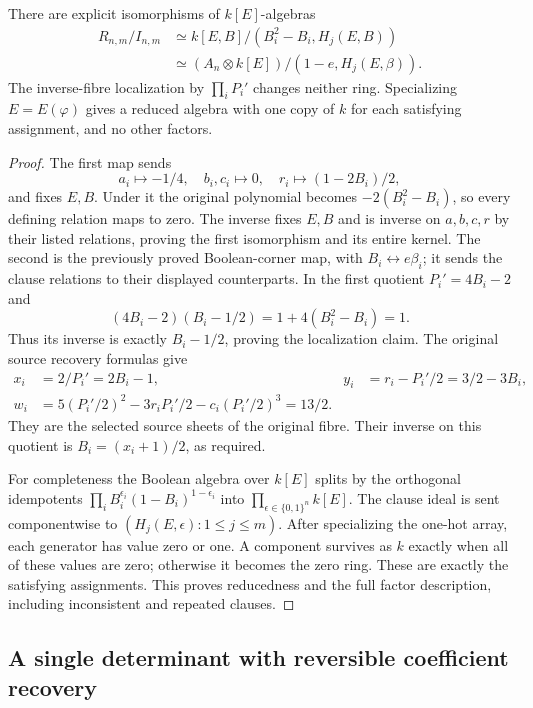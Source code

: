 \begin{proposition}\label{prop:sv-incidence}
There are explicit isomorphisms of $k[E]$-algebras
\begin{align*}
 R_{n,m}/I_{n,m}
 &\simeq k[E,B]/(B_i^2-B_i,H_j(E,B))\\
 &\simeq (A_n\otimes k[E])/(1-e,H_j(E,\beta)).
\end{align*}
The inverse-fibre localization by $\prod_i P_i'$ changes neither
ring. Specializing $E=E(\varphi)$ gives a reduced algebra with one
copy of $k$ for each satisfying assignment, and no other factors.
\end{proposition}
\begin{proof}
The first map sends
\[
 a_i\mapsto-1/4,\quad b_i,c_i\mapsto0,\quad
 r_i\mapsto(1-2B_i)/2,
\]
and fixes $E,B$. Under it the original polynomial becomes
$-2(B_i^2-B_i)$, so every defining relation maps to zero.
The inverse fixes $E,B$ and is inverse on $a,b,c,r$ by their
listed relations, proving the first isomorphism and its entire kernel.
The second is the previously proved Boolean-corner map, with
$B_i\leftrightarrow e\beta_i$; it sends the clause relations to
their displayed counterparts.
In the first quotient $P_i'=4B_i-2$ and
\[
 (4B_i-2)(B_i-1/2)=1+4(B_i^2-B_i)=1.
\]
Thus its inverse is exactly $B_i-1/2$, proving the localization
claim. The original source recovery formulas give
\begin{align*}
 x_i&=2/P_i'=2B_i-1,&
 y_i&=r_i-P_i'/2=3/2-3B_i,\\
 w_i&=5(P_i'/2)^2-3r_iP_i'/2-c_i(P_i'/2)^3=13/2.
\end{align*}
They are the selected source sheets of the original fibre. Their
inverse on this quotient is $B_i=(x_i+1)/2$, as required.

For completeness the Boolean algebra over $k[E]$ splits by the
orthogonal idempotents
$\prod_i B_i^{\epsilon_i}(1-B_i)^{1-\epsilon_i}$ into
$\prod_{\epsilon\in\{0,1\}^n}k[E]$. The clause ideal is sent
componentwise to $(H_j(E,\epsilon):1\le j\le m)$.
After specializing the one-hot array, each generator has value zero
or one. A component survives as $k$ exactly when all of these values
are zero; otherwise it becomes the zero ring. These are exactly
the satisfying assignments. This proves reducedness and the full
factor description, including inconsistent and repeated clauses.
\end{proof}

\subsection{A single determinant with reversible coefficient recovery}

